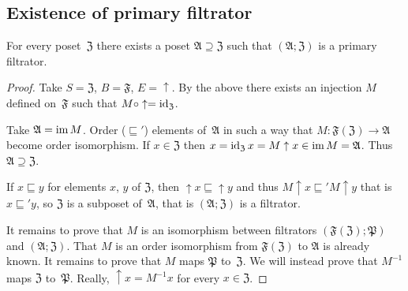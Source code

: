\subsection{Existence of primary filtrator}
\begin{thm}
For every poset~$\mathfrak{Z}$ there exists a poset $\mathfrak{A}\supseteq\mathfrak{Z}$
such that $(\mathfrak{A};\mathfrak{Z})$ is a primary filtrator.\end{thm}
\begin{proof}
Take $S=\mathfrak{Z}$, $B=\mathfrak{F}$, $E=\uparrow$. By the above
there exists an injection $M$ defined on~$\mathfrak{F}$ such that
$M\circ\uparrow=\operatorname{id}_{\mathfrak{Z}}$.

Take $\mathfrak{A}=\operatorname{im} M$. Order ($\sqsubseteq'$) elements of~$\mathfrak{A}$
in such a way that $M:\mathfrak{F}(\mathfrak{Z})\rightarrow\mathfrak{A}$
become order isomorphism. If $x\in\mathfrak{Z}$ then $x=\operatorname{id}_{\mathfrak{Z}}x=M\uparrow x\in\operatorname{im} M=\mathfrak{A}$.
Thus $\mathfrak{A}\supseteq\mathfrak{Z}$.

If $x\sqsubseteq y$ for elements $x$, $y$ of $\mathfrak{Z}$, then
$\uparrow x\sqsubseteq\uparrow y$ and thus $M\uparrow x\sqsubseteq'M\uparrow y$
that is $x\sqsubseteq'y$, so $\mathfrak{Z}$ is a subposet of~$\mathfrak{A}$,
that is $(\mathfrak{A};\mathfrak{Z})$ is a filtrator.

It remains to prove that $M$ is an isomorphism between filtrators
$(\mathfrak{F}(\mathfrak{Z});\mathfrak{P})$ and $(\mathfrak{A};\mathfrak{Z})$.
That $M$ is an order isomorphism from $\mathfrak{F}(\mathfrak{Z})$
to $\mathfrak{A}$ is already known. It remains to prove that $M$
maps $\mathfrak{P}$ to~$\mathfrak{Z}$. We will instead prove that
$M^{-1}$ maps $\mathfrak{Z}$ to~$\mathfrak{P}$. Really, $\uparrow x=M^{-1}x$ for every $x\in\mathfrak{Z}$.\end{proof}

